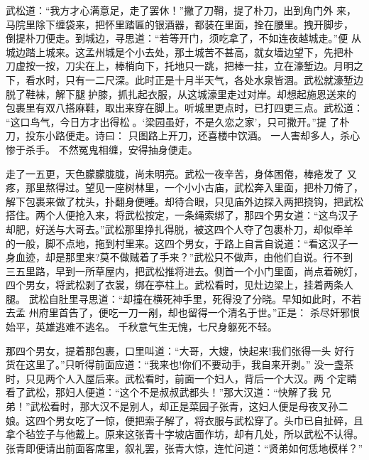 武松道：“我方才心满意足，走了罢休！”撇了刀鞘，提了朴刀，出到角门外
来，马院里除下缠袋来，把怀里踏匾的银酒器，都装在里面，拴在腰里。拽开脚步，
倒提朴刀便走。到城边，寻思道：“若等开门，须吃拿了，不如连夜越城走。”便
从城边踏上城来。这孟州城是个小去处，那土城苦不甚高，就女墙边望下，先把朴
刀虚按一按，刀尖在上，棒梢向下，托地只一跳，把棒一拄，立在濠堑边。月明之
下，看水时，只有一二尺深。此时正是十月半天气，各处水泉皆涸。武松就濠堑边
脱了鞋袜，解下腿护膝，抓扎起衣服，从这城濠里走过对岸。却想起施恩送来的
包裹里有双八搭麻鞋，取出来穿在脚上。听城里更点时，已打四更三点。武松道：
“这口鸟气，今日方才出得松。‘梁园虽好，不是久恋之家’，只可撒开。”提
了朴刀，投东小路便走。诗曰：
只图路上开刀，还喜楼中饮酒。
一人害却多人，杀心惨于杀手。
不然冤鬼相缠，安得抽身便走。

走了一五更，天色朦朦胧胧，尚未明亮。武松一夜辛苦，身体困倦，棒疮发了
又疼，那里熬得过。望见一座树林里，一个小小古庙，武松奔入里面，把朴刀倚了，
解下包裹来做了枕头，扑翻身便睡。却待合眼，只见庙外边探入两把挠钩，把武松
搭住。两个人便抢入来，将武松按定，一条绳索绑了，那四个男女道：“这鸟汉子
却肥，好送与大哥去。”武松那里挣扎得脱，被这四个人夺了包裹朴刀，却似牵羊
的一般，脚不点地，拖到村里来。这四个男女，于路上自言自说道：“看这汉子一
身血迹，却是那里来?莫不做贼着了手来？”武松只不做声，由他们自说。行不到
三五里路，早到一所草屋内，把武松推将进去。侧首一个小门里面，尚点着碗灯，
四个男女，将武松剥了衣裳，绑在亭柱上。武松看时，见灶边梁上，挂着两条人腿。
武松自肚里寻思道：“却撞在横死神手里，死得没了分晓。早知如此时，不若去孟
州府里首告了，便吃一刀一剐，却也留得一个清名于世。”正是：
杀尽奸邪恨始平，英雄逃难不逃名。
千秋意气生无愧，七尺身躯死不轻。

那四个男女，提着那包裹，口里叫道：“大哥，大嫂，快起来!我们张得一头
好行货在这里了。”只听得前面应道：“我来也!你们不要动手，我自来开剥。”
没一盏茶时，只见两个人入屋后来。武松看时，前面一个妇人，背后一个大汉。两
个定睛看了武松，那妇人便道：“这个不是叔叔武都头！”那大汉道：“快解了我
兄弟！”武松看时，那大汉不是别人，却正是菜园子张青，这妇人便是母夜叉孙二
娘。这四个男女吃了一惊，便把索子解了，将衣服与武松穿了。头巾已自扯碎，且
拿个毡笠子与他戴上。原来这张青十字坡店面作坊，却有几处，所以武松不认得。
张青即便请出前面客席里，叙礼罢，张青大惊，连忙问道：“贤弟如何恁地模样？”

